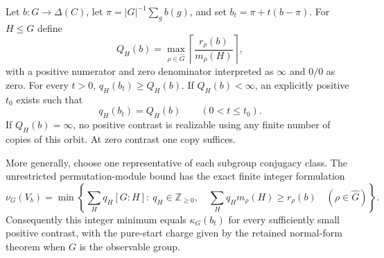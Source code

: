 \begin{theorem}
\label{thm:r75-orbit-multiplicity}
Let $b:G\to\Delta(C)$, let
$\pi=|G|^{-1}\sum_gb(g)$, and set $b_t=\pi+t(b-\pi)$. For $H\le G$ define
\begin{equation}\label{eq:r75-copy-number}
 Q_H(b)=\max_{\rho\in\widehat G}
 \left\lceil\frac{r_\rho(b)}{m_\rho(H)}\right\rceil,
\end{equation}
with a positive numerator and zero denominator interpreted as $\infty$
and $0/0$ as zero. For every $t>0$,
$q_H(b_t)\ge Q_H(b)$. If $Q_H(b)<\infty$, an explicitly positive $t_0$
exists such that
\[
 q_H(b_t)=Q_H(b)\qquad(0<t\le t_0).
\]
If $Q_H(b)=\infty$, no positive contrast is realizable using any finite
number of copies of this orbit. At zero contrast one copy suffices.

More generally, choose one representative of each subgroup conjugacy
class. The unrestricted permutation-module bound has the exact finite
integer formulation
\begin{equation}\label{eq:r75-multiplicity-cover}
 \nu_G(V_b)=
 \min\left\{
  \sum_H q_H[G:H]:\ q_H\in\mathbb Z_{\ge0},\quad
  \sum_Hq_Hm_\rho(H)\ge r_\rho(b)\quad(\rho\in\widehat G)
 \right\}.
\end{equation}
Consequently this integer minimum equals $\kappa_G(b_t)$ for every
sufficiently small positive contrast, with the pure-start charge given
by the retained normal-form theorem when $G$ is the observable group.
\end{theorem}
